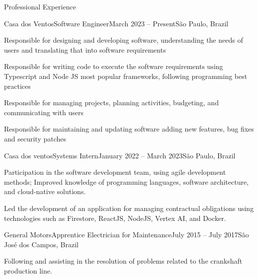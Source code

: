 \documentclass[]{template}
\begin{document}
\begin{section}{Professional Experience}
 \begin{subsection}{Casa dos Ventos}{Software Engineer}{March 2023 -- Present}{São Paulo, Brazil}
     \item Responsible for designing and developing software, understanding the needs of users and translating that into software requirements
     \item Responsible for writing code to execute the software requirements using Typescript and Node JS most popular frameworks, following programming best practices
     \item Responsible for managing projects, planning activities, budgeting, and communicating with users
     \item Responsible for maintaining and updating software adding new features, bug fixes and security patches
 \end{subsection}
 
 \begin{subsection}{Casa dos ventos}{Systems Intern}{January 2022 -- March 2023}{São Paulo, Brazil}
     \item Participation in the software development team, using agile development methods; Improved knowledge of programming languages, software architecture, and cloud-native solutions.
     \item Led the development of an application for managing contractual obligations using technologies such as Firestore, ReactJS, NodeJS, Vertex AI, and Docker.
 \end{subsection}
 
 \begin{subsection}{General Motors}{Apprentice Electrician for Maintenance}{July 2015 -- July 2017}{São José dos Campos, Brazil}
     \item Following and assisting in the resolution of problems related to the crankshaft production line.
 \end{subsection}
 
\end{section}



\end{document}
